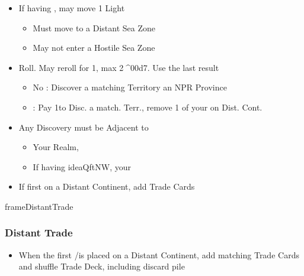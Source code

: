 \documentclass[10pt]{article}
\begin{document}
\begin{itemize}
	\item If having , may move 1 Light \ship
	\begin{itemize}
		\item Must move to a Distant Sea Zone
		\item May not enter a Hostile Sea Zone
	\end{itemize}
	\item Roll. May reroll for 1\diplopower, max 2^^^^00d7. Use the last result
	\begin{itemize}
		\item No \skull: Discover a matching Territory  an NPR Province  \town {} \vassal
		\item \skull: Pay 1\diplopower to Disc. a match. Terr.,  remove 1 of your \ships on Dist. Cont.
	\end{itemize}
	\item Any Discovery must be Adjacent to
	\begin{itemize}
		\item Your Realm, 
		\item If having idea{QftNW}, your \ship
	\end{itemize}
	\item If first \claim on a Distant Continent, add Trade Cards
\end{itemize}
\begin{dynamiccontents*}{frameDistantTrade}
	\subsubsection*{Distant Trade }
	\begin{itemize}
		\item When the first \claim/\dnpr is placed on a Distant Continent, add matching Trade Cards and shuffle Trade Deck, including discard pile
	\end{itemize}
\end{dynamiccontents*}
\end{document}
